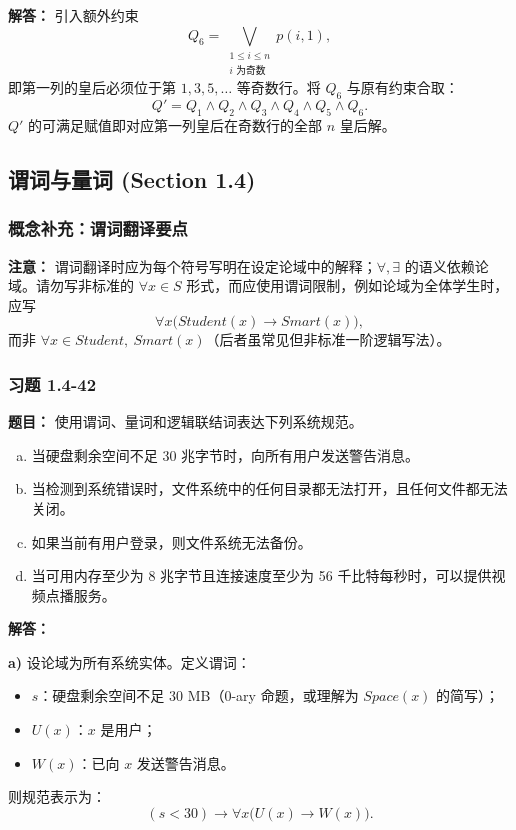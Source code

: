 \documentclass[11pt,UTF8]{article}
\begin{document}
\textbf{解答：} 引入额外约束
\[ Q_6 = \bigvee_{\substack{1 \le i \le n \\ i \text{ 为奇数}}} p(i,1), \]
即第一列的皇后必须位于第 $1, 3, 5, \dots$ 等奇数行。将 $Q_6$ 与原有约束合取：
\[ Q' = Q_1 \land Q_2 \land Q_3 \land Q_4 \land Q_5 \land Q_6. \]
$Q'$ 的可满足赋值即对应第一列皇后在奇数行的全部 $n$ 皇后解。



\subsection{谓词与量词 (Section 1.4)}

\subsubsection*{概念补充：谓词翻译要点}
\textbf{注意：} 谓词翻译时应为每个符号写明在设定论域中的解释；$\forall, \exists$ 的语义依赖论域。请勿写非标准的 $\forall x \in S$ 形式，而应使用谓词限制，例如论域为全体学生时，应写
\[ \forall x \bigl(Student(x) \to Smart(x)\bigr), \]
而非 $\forall x \in Student,\ Smart(x)$（后者虽常见但非标准一阶逻辑写法）。

\subsubsection*{习题 1.4-42}
\textbf{题目：} 使用谓词、量词和逻辑联结词表达下列系统规范。
\begin{enumerate}[a)]
    \item 当硬盘剩余空间不足 30 兆字节时，向所有用户发送警告消息。
    \item 当检测到系统错误时，文件系统中的任何目录都无法打开，且任何文件都无法关闭。
    \item 如果当前有用户登录，则文件系统无法备份。
    \item 当可用内存至少为 8 兆字节且连接速度至少为 56 千比特每秒时，可以提供视频点播服务。
\end{enumerate}

\textbf{解答：}

\textbf{a)} 设论域为所有系统实体。定义谓词：
\begin{itemize}
    \item $s$：硬盘剩余空间不足 30 MB（0-ary 命题，或理解为 $Space(x)$ 的简写）；
    \item $U(x)$：$x$ 是用户；
    \item $W(x)$：已向 $x$ 发送警告消息。
\end{itemize}
则规范表示为：
\[ (s < 30) \to \forall x \bigl(U(x) \to W(x)\bigr). \]
\end{document}
